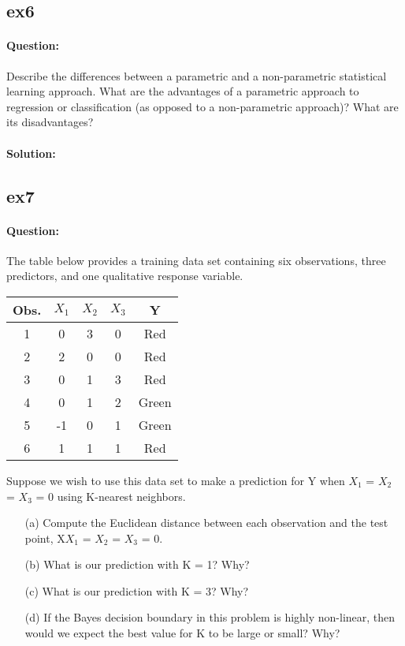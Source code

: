 \documentclass[a4paper,12pt,titlepage]{article} %
\begin{document}
\subsection{ex6}
\paragraph{Question:} Describe the differences between a parametric and a non-parametric statistical learning approach. What are the advantages of a parametric approach to regression or classification (as opposed to a non-parametric approach)? What are its disadvantages?

\paragraph{Solution:}

\subsection{ex7}
\paragraph{Question:} The table below provides a training data set containing six observations, three predictors, and one qualitative response variable.

\begin{center}
	\begin{tabular}{c|cccc}
		\hline
		Obs.& $X_{1}$ & $X_{2}$ & $X_{3}$ & Y \\
		\hline
		1 & 0 & 3 & 0 & Red \\
		2 & 2 & 0 & 0 & Red \\
		3 & 0 & 1 & 3 & Red \\
		4 & 0 & 1 & 2 & Green \\
		5 & -1 & 0 & 1 & Green \\
		6 & 1 & 1 & 1 & Red \\
		\hline
	\end{tabular}
\end{center}

Suppose we wish to use this data set to make a prediction for Y when $X_{1}$ = $X_{2}$ = $X_{3}$ = 0 using K-nearest neighbors.

\begin{itemize}
	\item[(a)] Compute the Euclidean distance between each observation and the test point, X$X_{1}$ = $X_{2}$ = $X_{3}$ = 0.
	\item[(b)] What is our prediction with K = 1? Why?
	\item[(c)] What is our prediction with K = 3? Why?
	\item[(d)] If the Bayes decision boundary in this problem is highly non-linear, then would we expect the best value for K to be large or small? Why?
\end{itemize}
\end{document}
